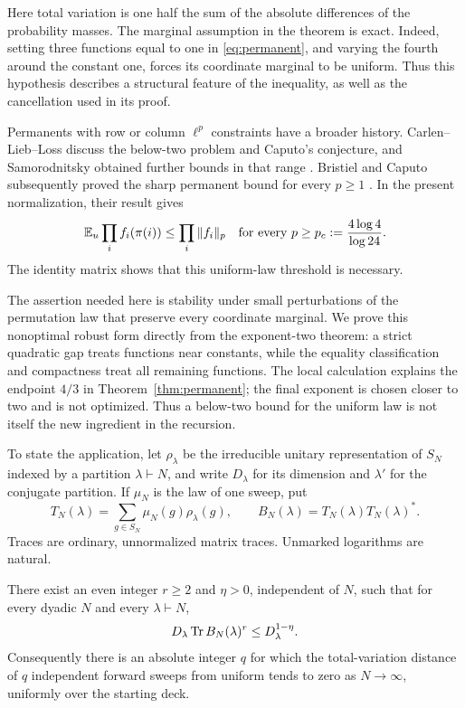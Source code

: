 Here total variation is one half the sum of the absolute differences of the probability masses. The marginal assumption in the theorem is exact. Indeed, setting three functions equal to one in \eqref{eq:permanent}, and varying the fourth around the constant one, forces its coordinate marginal to be uniform. Thus this hypothesis describes a structural feature of the inequality, as well as the cancellation used in its proof.

Permanents with row or column $\ell^p$ constraints have a broader history. Carlen--Lieb--Loss discuss the below-two problem and Caputo's conjecture, and Samorodnitsky obtained further bounds in that range \cite{cll2006,Samorodnitsky2008}. Bristiel and Caputo subsequently proved the sharp permanent bound for every $p\ge1$ \cite[Corollary~1.14]{BristielCaputo2024}. In the present normalization, their result gives
\[
 \mathbb E_u\prod_i f_i(\pi(i))\le\prod_i\|f_i\|_p
 \quad\text{for every }p\ge p_c:=\frac{4\log4}{\log24}.
\]
The identity matrix shows that this uniform-law threshold is necessary.

The assertion needed here is stability under small perturbations of the permutation law that preserve every coordinate marginal. We prove this nonoptimal robust form directly from the exponent-two theorem: a strict quadratic gap treats functions near constants, while the equality classification and compactness treat all remaining functions. The local calculation explains the endpoint $4/3$ in Theorem~\ref{thm:permanent}; the final exponent is chosen closer to two and is not optimized. Thus a below-two bound for the uniform law is not itself the new ingredient in the recursion.

To state the application, let $\rho_\lambda$ be the irreducible unitary representation of $S_N$ indexed by a partition $\lambda\vdash N$, and write $D_\lambda$ for its dimension and $\lambda'$ for the conjugate partition. If $\mu_N$ is the law of one sweep, put
\[
 T_N(\lambda)=\sum_{g\in S_N}\mu_N(g)\rho_\lambda(g),
 \qquad B_N(\lambda)=T_N(\lambda)T_N(\lambda)^*.
\]
Traces are ordinary, unnormalized matrix traces. Unmarked logarithms are natural.

\begin{theorem}\label{thm:moment}
There exist an even integer $r\ge2$ and $\eta>0$, independent of $N$, such that for every dyadic $N$ and every $\lambda\vdash N$,
\begin{equation}\label{eq:moment}
 D_\lambda\operatorname{Tr} B_N(\lambda)^r\le D_\lambda^{1-\eta}.
\end{equation}
Consequently there is an absolute integer $q$ for which the total-variation distance of $q$ independent forward sweeps from uniform tends to zero as $N\to\infty$, uniformly over the starting deck.
\end{theorem}

